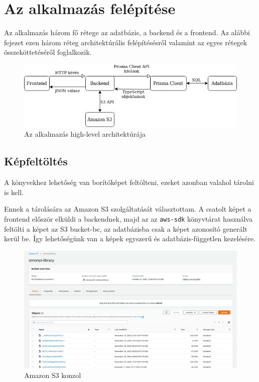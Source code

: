\chapter{Az alkalmazás felépítése}

Az alkalmazás három fő rétege az adatbázis, a backend és a frontend. Az alábbi fejezet ezen három réteg architektúrális
felépítésésről valamint az egyes rétegek összeköttetéséről foglalkozik.

\begin{figure}[!ht]
  \centering
  \includegraphics[width=150mm, keepaspectratio]{figures/architecture-diagram.png}
  \caption{Az alkalmazás high-level architektúrája}
  \label{fig:Architecture}
\end{figure}









\section{Képfeltöltés}

A könyvekhez lehetőség van borítóképet feltölteni, ezeket azonban valahol tárolni is kell.

Ennek a tárolására az Amazon S3 szolgáltatását választottam. A csatolt képet a frontend először elküldi a backendnek,
majd az az \lstinline|aws-sdk| könyvtárat használva feltölti a képet az S3 bucket-be, az adatbázisba csak a képet
azonosító generált kerül be. Így lehetőségünk van a képek egyszerű és adatbázis-független kezelésére.

\begin{figure}[!ht]
  \centering
  \includegraphics[width=125mm, keepaspectratio]{figures/s3-dashboard.png}
  \caption{Amazon S3 konzol}
  \label{fig:S3Console}
\end{figure}
